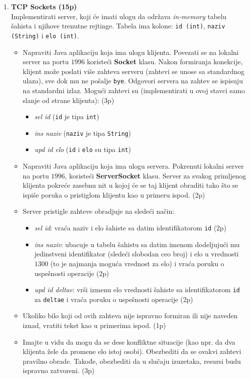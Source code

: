 \documentclass[]{article}
\begin{document}
\begin{enumerate}
  
\item \textbf{TCP Sockets (15p)}
\\Implementirati server, koji će imati ulogu da održava \emph{in-memory} tabelu šahista i njihove trenutne rejtinge. Tabela ima kolone: \texttt{id (int)}, \texttt{naziv (String)} i \texttt{elo (int)}.
\begin{itemize}
  \item Napraviti Java aplikaciju koja ima ulogu klijenta. Povezati se na lokalni server na portu $1996$ koristeći \textbf{Socket} klasu. Nakon formiranja konekcije, klijent mo\v{z}e poslati vi\v{s}e zahteva serveru (zahtevi se unose sa standardnog ulaza), sve dok mu ne pošalje \texttt{bye}. Odgovori servera na zahtev se ispisuju na standardni izlaz. Mogući zahtevi su (implementirati u ovoj stavci samo slanje od strane klijenta): \hfill (3p)
  \begin{itemize}
      \item \textit{sel id} (\texttt{id} je tipa \texttt{int})
      \item \textit{ins naziv} (\texttt{naziv} je tipa \texttt{String}) 
      \item \textit{upd id elo} (\texttt{id} i \texttt{elo} su tipa \texttt{int})
  \end{itemize}
  \item Napraviti Java aplikaciju koja ima ulogu servera. Pokrenuti lokalni server na portu $1996$, koristeći \textbf{ServerSocket} klasu. Server za svakog primljenog klijenta pokreće zasebnu nit u kojoj \'c{}e se taj klijent obraditi tako \v{s}to se ispi\v{s}e poruka o pristiglom klijentu kao u primeru ispod. \hfill (2p)
  \item Server pristigle zahteve obradjuje na slede\'c{}i na\v{c}in:
  \begin{itemize}
    \item \textit{sel id}: vra\'c{}a naziv i elo \v{s}ahiste sa datim identifikatorom \texttt{id} \hfill (2p)
    \item \textit{ins naziv}: ubacuje u tabelu \v{s}ahistu sa datim imenom dodeljuju\'c{}i mu jedinstveni identifikator (slede\'c{}i slobodan ceo broj) i elo u vrednosti $1300$ (to je najmanja mogu\'c{}a vrednost za elo) i vra\'c{}a poruku o uspe\v{s}nosti operacije \hfill (2p)
    \item \textit{upd id deltae}: vr\v{s}i izmenu elo vrednosti \v{s}ahiste sa identifikatorom \texttt{id} za \texttt{deltae} i vra\'c{}a poruku o uspe\v{s}nosti operacije \hfill (2p)
  \end{itemize}
  \item Ukoliko bilo koji od ovih zahteva nije ispravno formiran ili nije naveden iznad, vratiti tekst kao u primerima ispod. \hfill(1p)
  \item Imajte u vidu da mogu da se dese konfliktne situacije (kao npr. da dva klijenta žele da promene elo istoj osobi). Obezbediti da se ovakvi zahtevi pravilno obrade. Takođe, obezbediti da u slučaju izuzetaka, resursi budu ispravno zatvoreni. \hfill (3p)
\end{itemize}


\end{enumerate}
\end{document}
